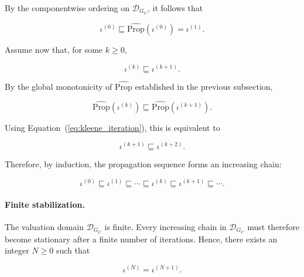 \documentclass[10pt]{article}
\begin{document}
By the componentwise ordering on $\mathcal D_{G_C}$, it follows that

\begin{equation}
	\iota^{(0)}
	\sqsubseteq
	\widehat{\mathrm{Prop}}
	\!\left(
	\iota^{(0)}
	\right)
	=
	\iota^{(1)}.
	\label{eq:initial_iteration_growth}
\end{equation}

Assume now that, for some $k\geq 0$,

\begin{equation}
	\iota^{(k)}
	\sqsubseteq
	\iota^{(k+1)}.
	\label{eq:iteration_induction_hypothesis}
\end{equation}

By the global monotonicity of $\widehat{\mathrm{Prop}}$ established in the
previous subsection,

\begin{equation}
	\widehat{\mathrm{Prop}}
	\!\left(
	\iota^{(k)}
	\right)
	\sqsubseteq
	\widehat{\mathrm{Prop}}
	\!\left(
	\iota^{(k+1)}
	\right).
	\label{eq:iteration_monotone_step}
\end{equation}

Using Equation~(\ref{eq:kleene_iteration}), this is equivalent to

\begin{equation}
	\iota^{(k+1)}
	\sqsubseteq
	\iota^{(k+2)}.
	\label{eq:iteration_induction_step}
\end{equation}

Therefore, by induction, the propagation sequence forms an increasing chain:

\begin{equation}
	\iota^{(0)}
	\sqsubseteq
	\iota^{(1)}
	\sqsubseteq
	\cdots
	\sqsubseteq
	\iota^{(k)}
	\sqsubseteq
	\iota^{(k+1)}
	\sqsubseteq
	\cdots.
	\label{eq:increasing_chain}
\end{equation}

\paragraph{Finite stabilization.}

The valuation domain $\mathcal D_{G_C}$ is finite. Every increasing chain in $\mathcal D_{G_C}$ must therefore become stationary after a finite number of iterations. Hence, there exists an integer $N\geq 0$ such that

\begin{equation}
	\iota^{(N)}
	=
	\iota^{(N+1)}.
	\label{eq:stabilization}
\end{equation}
\end{document}
